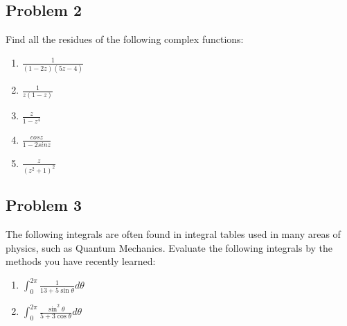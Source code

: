\documentclass{article}
\begin{document}
  \subsection{Problem 2}
  Find all the residues of the following complex functions:
  
\begin{enumerate}
    \item $\frac{1}{(1-2z)(5z-4)}$
    \item $\frac{1}{z(1-z)}$
    \item $\frac{z}{1-z^4}$
    \item $\frac{cosz}{1-2sinz}$
    \item $\frac{z}{(z^2+1)^2}$
\end{enumerate}
  \subsection{Problem 3}
  The following integrals are often found in integral tables used in many areas of physics, such as Quantum Mechanics. Evaluate the following integrals by the methods you have recently learned:
  \begin{enumerate}
    \item $\int_{0}^{2\pi}\frac{1}{13+5\sin{\theta}}d\theta$
    \item $\int_{0}^{2\pi}\frac{\sin^2{\theta}}{5+3\cos{\theta}}d\theta$
\end{enumerate}
  
\end{document}
